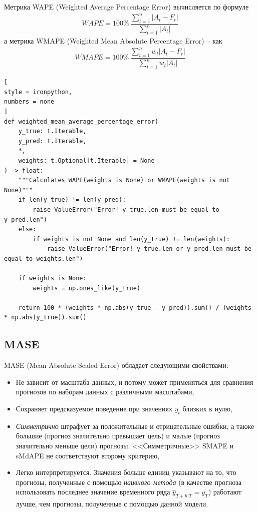 \documentclass[%
	11pt,
	a4paper,
	utf8,
		]{article}
\begin{document}
Метрика WAPE (Weighted Average Percentage Error) вычисляется по формуле
\begin{align*}
	WAPE = 100\% \, \dfrac{ \sum\limits_{t=1}^{n} |A_t - F_t| }{ \sum\limits_{t=1}^{n} |A_t|}
\end{align*}
а метрика WMAPE (Weighted Mean Absolute Percentage Error) -- как
\begin{align*}
	WMAPE = 100\% \, \dfrac{ \sum\limits_{t=1}^{n} w_t |A_t - F_t| }{ \sum\limits_{t=1}^{n} w_t |A_t|}
\end{align*}
\begin{lstlisting}[
style = ironpython,
numbers = none
]
def weighted_mean_average_percentage_error(
    y_true: t.Iterable,
    y_pred: t.Iterable,
    *,
    weights: t.Optional[t.Iterable] = None
) -> float:
    """Calculates WAPE(weights is None) or WMAPE(weights is not None)"""
    if len(y_true) != len(y_pred):
        raise ValueError("Error! y_true.len must be equal to y_pred.len")
    else:
        if weights is not None and len(y_true) != len(weights):
            raise ValueError("Error! y_true.len or y_pred.len must be equal to weights.len")
    
    if weights is None:
        weights = np.ones_like(y_true)
    
    return 100 * (weights * np.abs(y_true - y_pred)).sum() / (weights * np.abs(y_true)).sum()
\end{lstlisting}

\subsection{MASE}

MASE (Mean Absolute Scaled Error) обладает следующими свойствами:
\begin{itemize}
	\item Не зависит от масштаба данных, и потому может применяться для сравнения прогнозов по наборам данных с различными масштабами,
	
	\item Сохраняет предсказуемое поведение при значениях $ y_t $ близких к нулю,
	
	\item \emph{Симметрично} штрафует за положительные и отрицательные ошибки, а также большие (прогноз значительно превышает цель) и малые (прогноз значительно меньше цели) прогнозы. <<Симметричные>> SMAPE и sMdAPE не соответствуют второму критерию,
	
	\item Легко интерпретируется. Значения больше единиц указывают на то, что прогнозы, полученные с помощью \emph{наивного метода} (в качестве прогноза использовать последнее значение временного ряда $ \hat{y}_{T + h | T} = y_T $) работают лучше, чем прогнозы, полученные с помощью данной модели.
\end{itemize}
\end{document}

